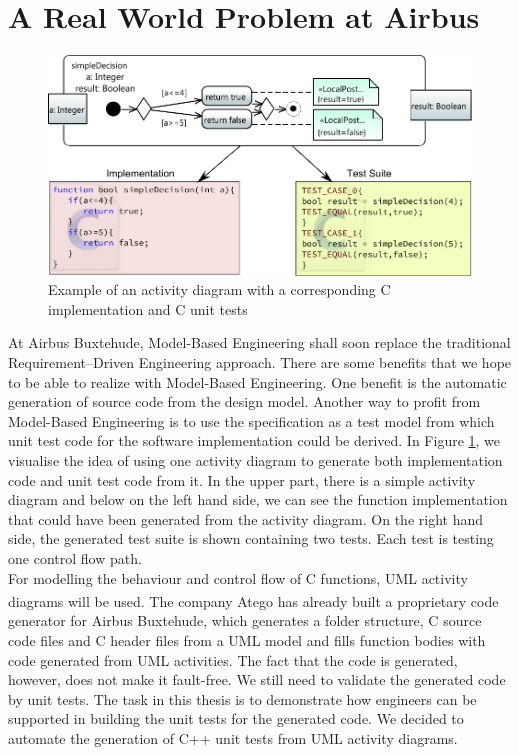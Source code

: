 \section{A Real World Problem at Airbus}
\begin{figure}
\label{fig:Act2Code+Tests}
\includegraphics[width=\textwidth]{./pics/Activity2Code+Test2.pdf}
\caption{Example of an activity diagram with a corresponding C implementation and C unit tests}
\end{figure}
At Airbus Buxtehude, Model-Based Engineering shall soon replace the traditional Require\-ment--Driven Engineering approach. There are some benefits that we hope to be able to realize with Model-Based Engineering. One benefit is the automatic generation of source code from the design model. Another way to profit from Model-Based Engineering is to use the specification as a test model from which unit test code for the software implementation could be derived. In Figure \ref{fig:Act2Code+Tests}, we visualise the idea of using one activity diagram to generate both implementation code and unit test code from it. In the upper part, there is a simple activity diagram and below on the left hand side, we can see the function implementation that could have been generated from the activity diagram. On the right hand side, the generated test suite is shown containing two tests. Each test is testing one control flow path.\\
For modelling the behaviour and control flow of C functions, UML activity diagrams will be used. The company Atego\textsuperscript{\textregistered} has already built a proprietary code generator for Airbus Buxtehude, which generates a folder structure, C source code files and C header files from a UML model and fills function bodies with code generated from UML activities. The fact that the code is generated, however, does not make it fault-free. We still need to validate the generated code by unit tests. The task in this thesis is to demonstrate how engineers can be supported in building the unit tests for the generated code. We decided to automate the generation of C++ unit tests from UML activity diagrams.\\
